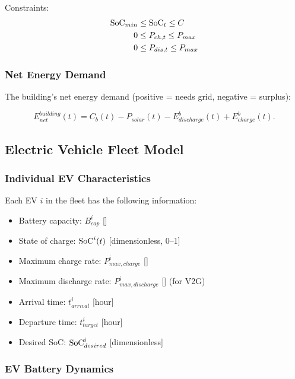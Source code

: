 Constraints:
\begin{align}
\text{SoC}_{min} &\leq \text{SoC}_t \leq C \\
0 &\leq P_{ch,t} \leq P_{max} \\
0 &\leq P_{dis,t} \leq P_{max}
\end{align}

\subsubsection{Net Energy Demand}

The building's net energy demand (positive = needs grid, negative = surplus):

\begin{equation}
E_{net}^{building}(t) = C_b(t) - P_{solar}(t) - E_{discharge}^b(t) + E_{charge}^b(t).
\end{equation}

\subsection{Electric Vehicle Fleet Model}
\label{subsec:ev_model}

\subsubsection{Individual EV Characteristics}

Each EV $i$ in the fleet has the following information:

\begin{itemize}
    \item Battery capacity: $B_{cap}^{i}$ [\kwh]
    \item State of charge: $\text{SoC}^i(t)$ [dimensionless, 0--1]
    \item Maximum charge rate: $P_{max,charge}^{i}$ [\kw]
    \item Maximum discharge rate: $P_{max,discharge}^{i}$ [\kw] (for V2G)
    \item Arrival time: $t_{arrival}^{i}$ [hour]
    \item Departure time: $t_{target}^{i}$ [hour]
    \item Desired SoC: $\text{SoC}_{desired}^{i}$ [dimensionless]
\end{itemize}

\subsubsection{EV Battery Dynamics}

